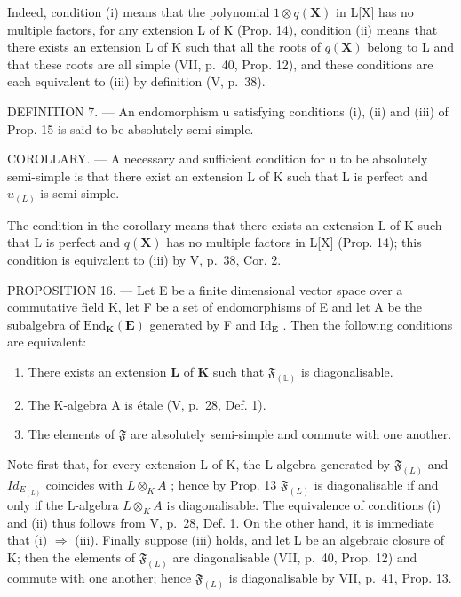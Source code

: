 Indeed, condition (i) means that the polynomial \(1 \otimes q(\mathbf{X})\) in L{[}X{]} has no multiple factors, for any extension L of K (Prop. 14), condition (ii) means that there exists an extension L of K such that all the roots of \(q(\mathbf{X})\) belong to L and that these roots are all simple (VII, p.~40, Prop. 12), and these conditions are each equivalent to (iii) by definition (V, p.~38).

DEFINITION 7. --- An endomorphism u satisfying conditions (i), (ii) and (iii) of Prop. 15 is said to be absolutely semi-simple.

COROLLARY. --- A necessary and sufficient condition for u to be absolutely semi-simple is that there exist an extension L of K such that L is perfect and \(u_{(L)}\) is semi-simple.

The condition in the corollary means that there exists an extension L of K such that L is perfect and \(q(\mathbf{X})\) has no multiple factors in L{[}X{]} (Prop. 14); this condition is equivalent to (iii) by V, p.~38, Cor. 2.

PROPOSITION 16. --- Let E be a finite dimensional vector space over a commutative field K, let F be a set of endomorphisms of E and let A be the subalgebra of \(\mathrm{End}_{\mathbf{K}}(\mathbf{E})\) generated by F and \(\mathrm{Id}_{\mathbf{E}}\) . Then the following conditions are equivalent:

\begin{enumerate}
\def\labelenumi{(\roman{enumi})}
\item
  There exists an extension \(\mathbf{L}\) of \(\mathbf{K}\) such that \(\mathfrak{F}_{(\mathbb{L})}\) is diagonalisable.
\item
  The K-algebra A is étale (V, p.~28, Def. 1).
\item
  The elements of \(\mathfrak{F}\) are absolutely semi-simple and commute with one another.
\end{enumerate}

Note first that, for every extension L of K, the L-algebra generated by \(\mathfrak{F}_{(L)}\) and \(Id_{E_{(L)}}\) coincides with \(L \otimes_{K} A\) ; hence by Prop. 13 \(\mathfrak{F}_{(L)}\) is diagonalisable if and only if the L-algebra \(L \otimes_{K} A\) is diagonalisable. The equivalence of conditions (i) and (ii) thus follows from V, p.~28, Def. 1. On the other hand, it is immediate that (i) \(\Rightarrow\) (iii). Finally suppose (iii) holds, and let L be an algebraic closure of K; then the elements of \(\mathfrak{F}_{(L)}\) are diagonalisable (VII, p.~40, Prop. 12) and commute with one another; hence \(\mathfrak{F}_{(L)}\) is diagonalisable by VII, p.~41, Prop. 13.

